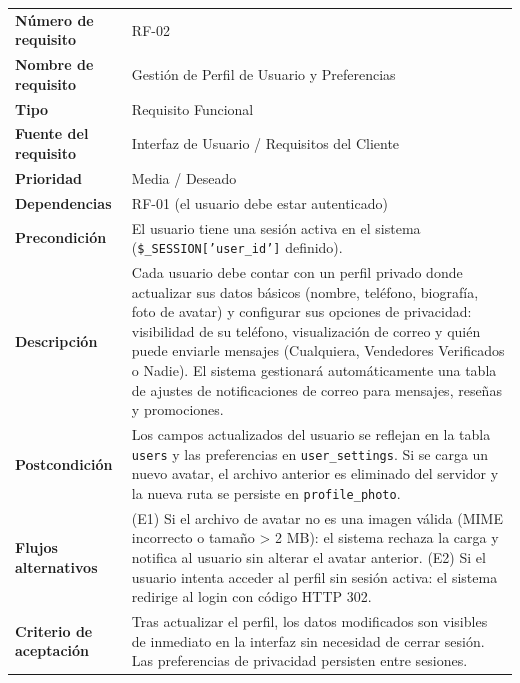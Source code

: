 \documentclass[11pt,a4paper]{report}
\begin{document}
\begin{table}[H]
\centering
\begin{tabularx}{\textwidth}{|l|L|}
\hline
{} \\ \hline
\textbf{Número de requisito} & RF-02 \\ \hline
\textbf{Nombre de requisito} & Gestión de Perfil de Usuario y Preferencias \\ \hline
\textbf{Tipo} & Requisito Funcional \\ \hline
\textbf{Fuente del requisito} & Interfaz de Usuario / Requisitos del Cliente \\ \hline
\textbf{Prioridad} & Media / Deseado \\ \hline
\textbf{Dependencias} & RF-01 (el usuario debe estar autenticado) \\ \hline
\textbf{Precondición} & El usuario tiene una sesión activa en el sistema (\texttt{\$\_SESSION['user\_id']} definido). \\ \hline
\textbf{Descripción} & Cada usuario debe contar con un perfil privado donde actualizar sus datos básicos (nombre, teléfono, biografía, foto de avatar) y configurar sus opciones de privacidad: visibilidad de su teléfono, visualización de correo y quién puede enviarle mensajes (Cualquiera, Vendedores Verificados o Nadie). El sistema gestionará automáticamente una tabla de ajustes de notificaciones de correo para mensajes, reseñas y promociones. \\ \hline
\textbf{Postcondición} & Los campos actualizados del usuario se reflejan en la tabla \texttt{users} y las preferencias en \texttt{user\_settings}. Si se carga un nuevo avatar, el archivo anterior es eliminado del servidor y la nueva ruta se persiste en \texttt{profile\_photo}. \\ \hline
\textbf{Flujos alternativos} & (E1) Si el archivo de avatar no es una imagen válida (MIME incorrecto o tamaño > 2 MB): el sistema rechaza la carga y notifica al usuario sin alterar el avatar anterior. (E2) Si el usuario intenta acceder al perfil sin sesión activa: el sistema redirige al login con código HTTP 302. \\ \hline
\textbf{Criterio de aceptación} & Tras actualizar el perfil, los datos modificados son visibles de inmediato en la interfaz sin necesidad de cerrar sesión. Las preferencias de privacidad persisten entre sesiones. \\ \hline
\end{tabularx}
\end{table}
\end{document}
